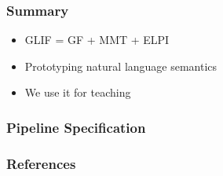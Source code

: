 \documentclass[aspectratio=169]{beamer}
\begin{document}





\begin{frame}
    \frametitle{Summary}
    \begin{itemize}
        \item GLIF = GF + MMT + ELPI
        \item Prototyping natural language semantics
        \item We use it for teaching
    \end{itemize}
    
    \vspace{2em}
    \centering
    
\end{frame}

\appendix

\begin{frame}
    \frametitle{Pipeline Specification}
    
\end{frame}





\begin{frame}[allowframebreaks,t]
    \frametitle{References}
    \printbibliography
\end{frame}
\end{document}
